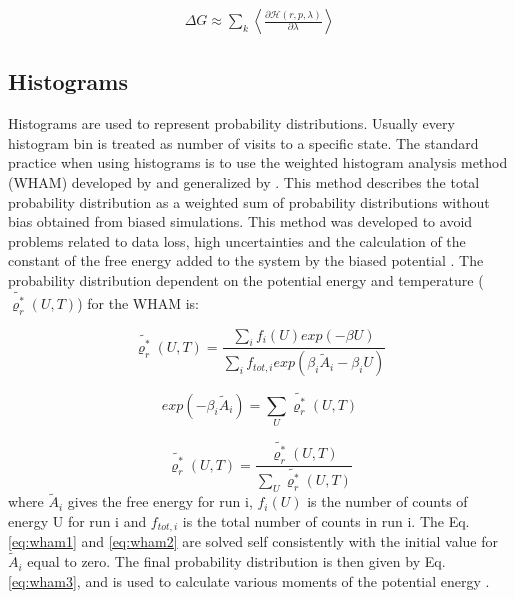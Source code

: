 \begin{equation}
\label{eq:ti4}
\begin{aligned}
\Delta G \approx \sum _{k}  \left \langle \frac{\partial \mathcal{H}(r,p,\lambda)}{\partial \lambda} \right \rangle 
\end{aligned}
\end{equation}

\subsection{Histograms}
Histograms are used  to represent probability distributions. Usually every histogram bin is treated as number of visits to a specific state. The standard practice when using histograms is to use the weighted histogram analysis method (WHAM) developed by  and generalized by  \cite{freeenergy}. This method describes the total probability distribution as a weighted sum of probability distributions without bias  obtained from biased simulations. This method was developed to avoid problems related to data loss, high uncertainties and the calculation of the constant of the free energy added to the system by the biased potential \cite{ROUX1995275}. The probability distribution dependent on the potential energy and temperature ($\tilde{\varrho_{r}^{*}}(U,T)$) for the WHAM is:

\begin{equation}
\label{eq:wham1}
\tilde{\varrho_{r}^{*}}(U,T) = \frac{\sum_{i} f_{i}(U) exp(- \beta U)}{\sum_{i} f_{tot,i} exp(\beta _{i} \tilde{A}_{i} -\beta _{i} U) }
\end{equation} 

\begin{equation}
\label{eq:wham2}
exp(- \beta _{i} \tilde{A}_{i}) = \sum_{U} \tilde{\varrho_{r}^{*}}(U,T) 
\end{equation}

\begin{equation}
\label{eq:wham3}
\tilde{\varrho_{r}^{*}}(U,T) = \frac{\tilde{\varrho_{r}^{*}}(U,T)}{\sum_{U} \tilde{\varrho_{r}^{*}}(U,T)}
\end{equation} 
where $\tilde{A}_{i}$ gives the free energy for run i, $f_{i}(U)$ is the number of counts of energy U for run i and $f_{tot,i}$ is the total number of counts in run i. The Eq. \eqref{eq:wham1} and \eqref{eq:wham2} are solved self consistently with the initial value for $\tilde{A}_{i}$ equal to zero. The final probability distribution is then given by Eq. \eqref{eq:wham3}, and is used to calculate various moments of the potential energy \cite{freeenergy}.


